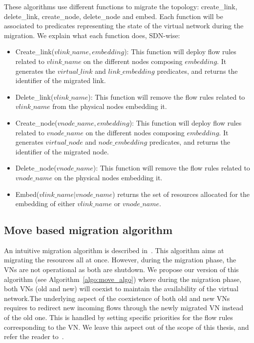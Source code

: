 These algorithms use different functions to migrate the topology: create\_link, delete\_link, create\_node, delete\_node and embed. 
Each function will be associated to predicates representing the state of the virtual network during the migration.
We explain what each function does, SDN-wise:

\begin{itemize}
\item Create\_link($vlink\_name,embedding$): This function will deploy flow rules related to $vlink\_name$ on the different nodes composing $embedding$. It generates the $virtual\_link$ and $link\_embedding$ predicates, and returns the identifier of the migrated link.
\item Delete\_link($vlink\_name$): This function will remove the flow rules related to $vlink\_name$ from the physical nodes embedding it.
\item Create\_node($vnode\_name,embedding$): This function will deploy flow rules related to $vnode\_name$ on the different nodes composing $embedding$. It generates $virtual\_node$ and $node\_embedding$ predicates, and returns the identifier of the migrated node.
\item Delete\_node($vnode\_name$): This function will remove the flow rules related to  $vnode\_name$ on the physical nodes embedding it.
\item Embed($vlink\_name \vert vnode\_name$) returns the set of resources allocated for the embedding of either $vlink\_name$ or $vnode\_name$. 
\end{itemize}



\subsection{Move based migration algorithm}
\label{sec:move-algo}

An intuitive migration algorithm is described in~\cite{Lime-Ghorbani2014}. 
This algorithm aims at migrating the resources all at once.
However, during the migration phase, the VNs are not operational as both are shutdown.
We propose our version of this algorithm (see Algorithm~\ref{algo:move_algo}) where during the migration phase, both VNs (old and new) will coexist to maintain the availability of the virtual network.The underlying aspect of the coexistence of both old and new VNs requires to redirect new incoming flows through the newly migrated VN instead of the old one.
This is handled by setting specific priorities for the flow rules corresponding to the VN.
We leave this aspect out of the scope of this thesis, and refer the reader to~\cite{Lime-Ghorbani2014}.

